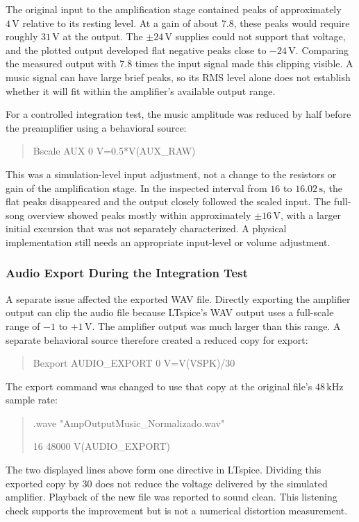 \documentclass[conference]{IEEEtran}
\begin{document}
The original input to the amplification stage contained peaks of approximately $4\,\mathrm{V}$ relative to its resting level. At a gain of about 7.8, these peaks would require roughly $31\,\mathrm{V}$ at the output. The $\pm24\,\mathrm{V}$ supplies could not support that voltage, and the plotted output developed flat negative peaks close to $-24\,\mathrm{V}$. Comparing the measured output with 7.8 times the input signal made this clipping visible. A music signal can have large brief peaks, so its RMS level alone does not establish whether it will fit within the amplifier's available output range.

For a controlled integration test, the music amplitude was reduced by half before the preamplifier using a behavioral source:
\begin{quote}
\small\ttfamily
Bscale AUX 0 V=0.5*V(AUX\_RAW)
\end{quote}
This was a simulation-level input adjustment, not a change to the resistors or gain of the amplification stage. In the inspected interval from $16$ to $16.02\,\mathrm{s}$, the flat peaks disappeared and the output closely followed the scaled input. The full-song overview showed peaks mostly within approximately $\pm16\,\mathrm{V}$, with a larger initial excursion that was not separately characterized. A physical implementation still needs an appropriate input-level or volume adjustment.

\subsubsection{Audio Export During the Integration Test}
A separate issue affected the exported WAV file. Directly exporting the amplifier output can clip the audio file because LTspice's WAV output uses a full-scale range of $-1$ to $+1\,\mathrm{V}$. The amplifier output was much larger than this range. A separate behavioral source therefore created a reduced copy for export:
\begin{quote}
\small\ttfamily
Bexport AUDIO\_EXPORT 0 V=V(VSPK)/30
\end{quote}
The export command was changed to use that copy at the original file's $48\,\mathrm{kHz}$ sample rate:
\begin{quote}
\small\ttfamily
.wave "AmpOutputMusic\_Normalizado.wav"\par
16 48000 V(AUDIO\_EXPORT)
\end{quote}
The two displayed lines above form one directive in LTspice. Dividing this exported copy by 30 does not reduce the voltage delivered by the simulated amplifier. Playback of the new file was reported to sound clean. This listening check supports the improvement but is not a numerical distortion measurement.
\end{document}
